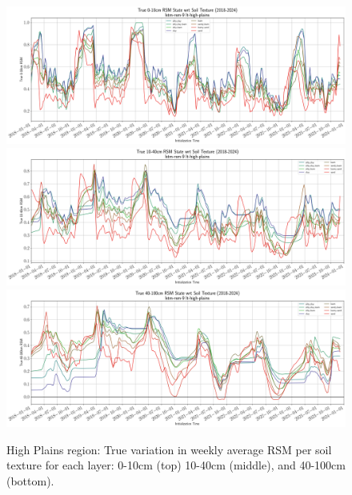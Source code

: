 \begin{figure}[hp!]
    \centering

    \includegraphics[width=.99\linewidth,draft=false]{figures/lt-high-plains/eval-grid_lt-high-plains_lstm-rsm-9_pixelwise-time-stats_txtr-true-state-rsm-10.png}
    \includegraphics[width=.99\linewidth,draft=false]{figures/lt-high-plains/eval-grid_lt-high-plains_lstm-rsm-9_pixelwise-time-stats_txtr-true-state-rsm-40.png}
    \includegraphics[width=.99\linewidth,draft=false]{figures/lt-high-plains/eval-grid_lt-high-plains_lstm-rsm-9_pixelwise-time-stats_txtr-true-state-rsm-100.png}

    \caption{High Plains region: True variation in weekly average RSM per soil texture for each layer: 0-10cm (top) 10-40cm (middle), and 40-100cm (bottom).}
    \label{lt_true-rsm_high-plains}
\end{figure}

